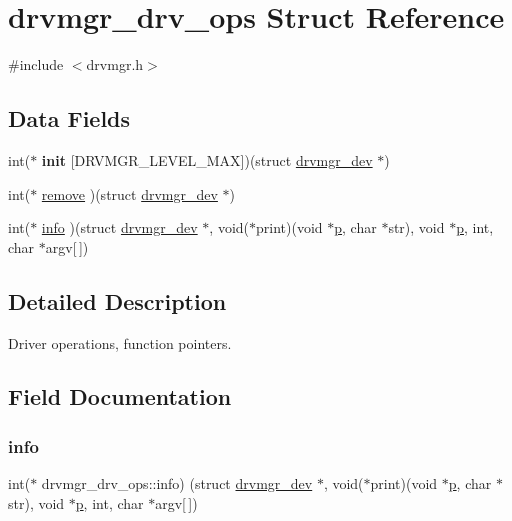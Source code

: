 \hypertarget{structdrvmgr__drv__ops}{}\section{drvmgr\+\_\+drv\+\_\+ops Struct Reference}
\label{structdrvmgr__drv__ops}


{\ttfamily \#include $<$drvmgr.\+h$>$}

\subsection*{Data Fields}
\begin{DoxyCompactItemize}
\item 
\mbox{\label{structdrvmgr__drv__ops_a2cf7a51325d04afabcfac750e1f2b77d}} 
int($\ast$ {\bfseries init} \mbox{[}D\+R\+V\+M\+G\+R\+\_\+\+L\+E\+V\+E\+L\+\_\+\+M\+AX\mbox{]})(struct \mbox{\hyperlink{structdrvmgr__dev}{drvmgr\+\_\+dev}} $\ast$)
\item 
int($\ast$ \mbox{\hyperlink{structdrvmgr__drv__ops_afa653aa2b8ab4a45b08d7c7a14aa1151}{remove}} )(struct \mbox{\hyperlink{structdrvmgr__dev}{drvmgr\+\_\+dev}} $\ast$)
\item 
int($\ast$ \mbox{\hyperlink{structdrvmgr__drv__ops_a4b094f61f1613f2dc49b8ee2753a058e}{info}} )(struct \mbox{\hyperlink{structdrvmgr__dev}{drvmgr\+\_\+dev}} $\ast$, void($\ast$print)(void $\ast$\mbox{\hyperlink{sun4u_2tte_8h_a27952ffc298d15b4fc0e7ee6b2a044ac}{p}}, char $\ast$str), void $\ast$\mbox{\hyperlink{sun4u_2tte_8h_a27952ffc298d15b4fc0e7ee6b2a044ac}{p}}, int, char $\ast$argv\mbox{[}$\,$\mbox{]})
\end{DoxyCompactItemize}


\subsection{Detailed Description}
Driver operations, function pointers. 

\subsection{Field Documentation}
\mbox{\label{structdrvmgr__drv__ops_a4b094f61f1613f2dc49b8ee2753a058e}} 
\subsubsection{\texorpdfstring{info}{info}}
{\footnotesize\ttfamily int($\ast$ drvmgr\+\_\+drv\+\_\+ops\+::info) (struct \mbox{\hyperlink{structdrvmgr__dev}{drvmgr\+\_\+dev}} $\ast$, void($\ast$print)(void $\ast$\mbox{\hyperlink{sun4u_2tte_8h_a27952ffc298d15b4fc0e7ee6b2a044ac}{p}}, char $\ast$str), void $\ast$\mbox{\hyperlink{sun4u_2tte_8h_a27952ffc298d15b4fc0e7ee6b2a044ac}{p}}, int, char $\ast$argv\mbox{[}$\,$\mbox{]})}

